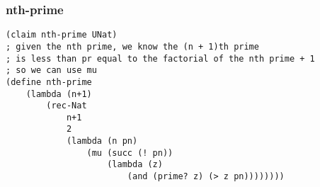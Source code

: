 \subsubsection{nth-prime} \label{code:nth-prime}
\begin{verbatim}
(claim nth-prime UNat)
; given the nth prime, we know the (n + 1)th prime
; is less than pr equal to the factorial of the nth prime + 1
; so we can use mu
(define nth-prime
    (lambda (n+1)
        (rec-Nat
            n+1
            2
            (lambda (n pn) 
                (mu (succ (! pn)) 
                    (lambda (z) 
                        (and (prime? z) (> z pn))))))))
\end{verbatim}


